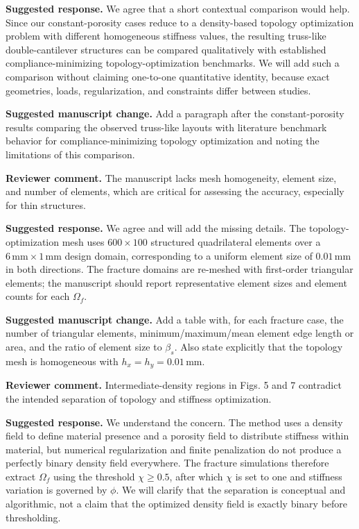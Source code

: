 \documentclass[11pt,a4paper]{article}
\newcommand{\comment}[1]{\par\noindent\textbf{Reviewer comment.} #1\par}
\newcommand{\response}[1]{\par\noindent\textbf{Suggested response.} #1\par}
\newcommand{\change}[1]{\par\noindent\textbf{Suggested manuscript change.} #1\par}
\begin{document}
\response{We agree that a short contextual comparison would help. Since our
constant-porosity cases reduce to a density-based topology optimization problem
with different homogeneous stiffness values, the resulting truss-like
double-cantilever structures can be compared qualitatively with established
compliance-minimizing topology-optimization benchmarks. We will add such a
comparison without claiming one-to-one quantitative identity, because exact
geometries, loads, regularization, and constraints differ between studies.}

\change{Add a paragraph after the constant-porosity results comparing the
observed truss-like layouts with literature benchmark behavior for
compliance-minimizing topology optimization and noting the limitations of this
comparison.}

\comment{The manuscript lacks mesh homogeneity, element size, and number of
elements, which are critical for assessing the accuracy, especially for thin
structures.}

\response{We agree and will add the missing details. The topology-optimization
mesh uses \(600\times100\) structured quadrilateral elements over a
\(6\,\mathrm{mm}\times1\,\mathrm{mm}\) design domain, corresponding to a
uniform element size of \(0.01\,\mathrm{mm}\) in both directions. The fracture
domains are re-meshed with first-order triangular elements; the manuscript
should report representative element sizes and element counts for each
\(\Omega_f\).}

\change{Add a table with, for each fracture case, the number of triangular
elements, minimum/maximum/mean element edge length or area, and the ratio of
element size to \(\beta_s\). Also state explicitly that the topology mesh is
homogeneous with \(h_x=h_y=0.01\,\mathrm{mm}\).}

\comment{Intermediate-density regions in Figs. 5 and 7 contradict the intended
separation of topology and stiffness optimization.}

\response{We understand the concern. The method uses a density field to define
material presence and a porosity field to distribute stiffness within material,
but numerical regularization and finite penalization do not produce a perfectly
binary density field everywhere. The fracture simulations therefore extract
\(\Omega_f\) using the threshold \(\chi\ge0.5\), after which \(\chi\) is set to
one and stiffness variation is governed by \(\phi\). We will clarify that the
separation is conceptual and algorithmic, not a claim that the optimized
density field is exactly binary before thresholding.}
\end{document}

